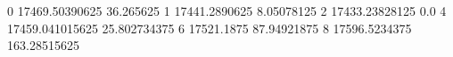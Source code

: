 0 17469.50390625 36.265625
1 17441.2890625 8.05078125
2 17433.23828125 0.0
4 17459.041015625 25.802734375
6 17521.1875 87.94921875
8 17596.5234375 163.28515625
